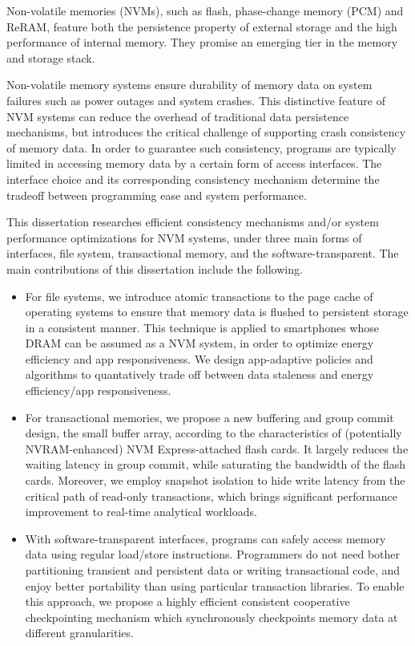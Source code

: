 \begin{eabstract}

Non-volatile memories (NVMs), such as flash, phase-change memory (PCM) and ReRAM, feature both the persistence property of external storage and the high performance of internal memory. They promise an emerging tier in the memory and storage stack.

Non-volatile memory systems ensure durability of memory data on system failures such as power outages and system crashes. This distinctive feature of NVM systems can reduce the overhead of traditional data persistence mechanisms, but introduces the critical challenge of supporting crash consistency of memory data. In order to guarantee such consistency, programs are typically limited in accessing memory data by a certain form of access interfaces. The interface choice and its corresponding consistency mechanism determine the tradeoff between programming ease and system performance.

This dissertation researches efficient consistency mechanisms and/or system performance optimizations for NVM systems, under three main forms of interfaces, file system, transactional memory, and the software-transparent. The main contributions of this dissertation include the following.

\begin{itemize}
\item For file systems, we introduce atomic transactions to the page cache of operating systems to ensure that memory data is flushed to persistent storage in a consistent manner. This technique is applied to smartphones whose DRAM can be assumed as a NVM system, in order to optimize energy efficiency and app responsiveness. We design app-adaptive policies and algorithms to quantatively trade off between data staleness and energy efficiency/app responsiveness.

\item For transactional memories, we propose a new buffering and group commit design, the small buffer array, according to the characteristics of (potentially NVRAM-enhanced) NVM Express-attached flash cards. It largely reduces the waiting latency in group commit, while saturating the bandwidth of the flash cards. Moreover, we employ snapshot isolation to hide write latency from the critical path of read-only transactions, which brings significant performance improvement to real-time analytical workloads.

\item With software-transparent interfaces, programs can safely access memory data using regular load/store instructions. Programmers do not need bother partitioning transient and persistent data or writing transactional code, and enjoy better portability than using particular transaction libraries. To enable this approach, we propose a highly efficient consistent cooperative checkpointing mechanism which synchronously checkpoints memory data at different granularities.

\end{itemize}

\end{eabstract}


